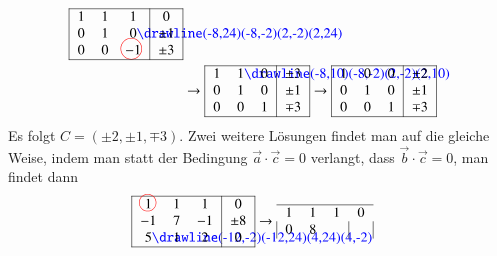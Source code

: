 \begin{beispiel}
\begin{align*}
\begin{tabular}{|>{$}c<{$}>{$}c<{$}>{$}c<{$}|>{$}c<{$}|}
\hline
1&1&1&0\\
0&1&0%
\begin{picture}(0,0)%
\color{blue}\drawline(-8,24)(-8,-2)(2,-2)(2,24)
\end{picture}%
&\pm1\\
0&0&-1%
\begin{picture}(0,0)
\color{red}\put(-7,4){\circle{15}}
\end{picture}%
&\pm3\\
\hline
\end{tabular}
\\
&
\rightarrow
\begin{tabular}{|>{$}c<{$}>{$}c<{$}>{$}c<{$}|>{$}c<{$}|}
\hline
1&1%
\begin{picture}(0,0)%
\color{blue}\drawline(-8,10)(-8,-2)(2,-2)(2,10)
\end{picture}%
&0&\pm3\\
0&1&0&\pm1\\
0&0&1&\mp3\\
\hline
\end{tabular}
\rightarrow
\begin{tabular}{|>{$}c<{$}>{$}c<{$}>{$}c<{$}|>{$}c<{$}|}
\hline
1&0&0&\pm 2\\
0&1&0&\pm1\\
0&0&1&\mp3\\
\hline
\end{tabular}
\end{align*}
Es folgt $C=(\pm 2,\pm1,\mp3)$.
Zwei weitere Lösungen findet
man auf die gleiche Weise, indem man statt der Bedingung $\vec a\cdot\vec c=0$
verlangt, dass $\vec b\cdot\vec c=0$, man findet dann
\begin{align*}
\begin{tabular}{|>{$}c<{$}>{$}c<{$}>{$}c<{$}|>{$}c<{$}|}
\hline
1%
\begin{picture}(0,0)
\color{red}\put(-3,4){\circle{12}}
\end{picture}%
&1&1&0\\
-1&7&-1&\pm8\\
5%
\begin{picture}(0,0)%
\color{blue}\drawline(-12,-2)(-12,24)(4,24)(4,-2)
\end{picture}%
&1&2&0\\
\hline
\end{tabular}
&
\rightarrow
\begin{tabular}{|>{$}c<{$}>{$}c<{$}>{$}c<{$}|>{$}c<{$}|}
\hline
1&1&1&0\\
0&8%
\begin{picture}(0,0)

\end{picture}
\end{tabular}
\end{align*}
\end{beispiel}
